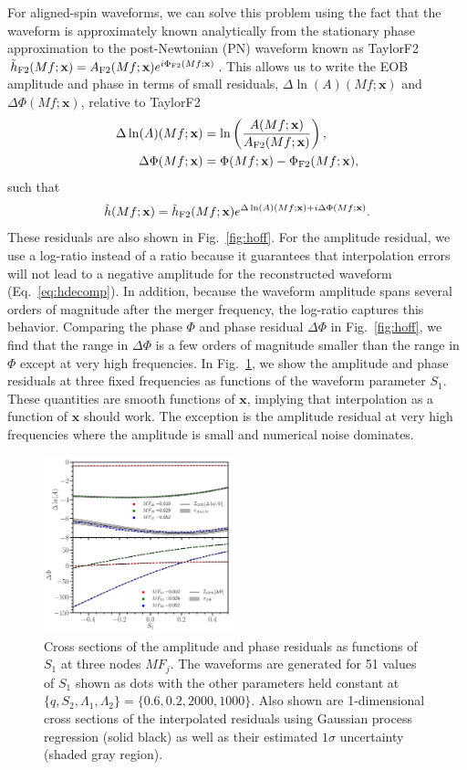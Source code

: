 \documentclass[prd,aps,letter,twocolumn,floatfix,notitlepage,nofootinbib]{revtex4-1}
\def\bx{\mathbf{x}}
\begin{document}
For aligned-spin waveforms, we can solve this problem using the fact that the waveform is approximately known analytically from the stationary phase approximation to the post-Newtonian (PN) waveform known as TaylorF2~\cite{BuonannoIyerOchsner2009} $\tilde h_{\rm F2}(Mf; \bx) = A_{\rm F2}(Mf; \bx) e^{i\Phi_{\rm F2} (Mf; \bx)}$. This allows us to write the EOB amplitude and phase in terms of small residuals, $\Delta\ln(A)(Mf; \bx)$ and $\Delta\Phi(Mf; \bx)$, relative to TaylorF2
\begin{align}
\Delta\ln(A)(Mf; \bx) &= \ln\left(\frac{ A(Mf; \bx) }{ A_{\rm F2}(Mf; \bx)}\right), \label{eq:ampres}\\
\Delta\Phi(Mf; \bx) & = \Phi(Mf; \bx) - \Phi_{\rm F2}(Mf; \bx), \label{eq:phaseres}
\end{align}
such that
\begin{align}
\tilde h(Mf; \bx) = \tilde h_{\rm F2}(Mf; \bx) e^{\Delta\ln(A)(Mf; \bx) + i  \Delta\Phi(Mf; \bx)}.
\label{eq:hdecomp}
\end{align}
These residuals are also shown in Fig.~\ref{fig:hoff}. For the amplitude residual, we use a log-ratio instead of a ratio because it guarantees that interpolation errors will not lead to a negative amplitude for the reconstructed waveform (Eq.~\eqref{eq:hdecomp}). In addition, because the waveform amplitude spans several orders of magnitude after the merger frequency, the log-ratio captures this behavior. Comparing the phase $\Phi$ and phase residual $\Delta\Phi$ in Fig.~\ref{fig:hoff}, we find that the range in $\Delta\Phi$ is a few orders of magnitude smaller than the range in $\Phi$ except at very high frequencies. In Fig.~\ref{fig:dhofs}, we show the amplitude and phase residuals at three fixed frequencies as functions of the waveform parameter $S_1$. These quantities are smooth functions of $\bx$, implying that interpolation as a function of $\bx$ should work. The exception is the amplitude residual at very high frequencies where the amplitude is small and numerical noise dominates.

\begin{figure}[htb]
\centering
\includegraphics[width=0.49\textwidth]{dhofs.pdf}
\caption{Cross sections of the amplitude and phase residuals as functions of $S_1$ at three nodes $MF_j$. The waveforms are generated for 51 values of $S_1$ shown as dots with the other parameters held constant at $\{q, S_2, \Lambda_1, \Lambda_2\} = \{0.6, 0.2, 2000, 1000\}$. Also shown are 1-dimensional cross sections of the interpolated residuals using Gaussian process regression (solid black) as well as their estimated $1\sigma$ uncertainty (shaded gray region).}
\label{fig:dhofs}
\end{figure}
\end{document}
